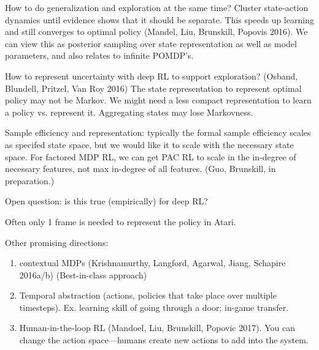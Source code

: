 How to do generalization and exploration at the same time?
Cluster state-action dynamics until evidence shows that it should be separate. This speeds up learning and still converges to optimal policy (Mandel, Liu, Brunskill, Popovis 2016). 
We can view this as posterior sampling over state representation as well as model parameters, and also relates to infinite POMDP's.

How to represent uncertainty with deep RL to support exploration? (Osband, Blundell, Pritzel, Van Roy 2016)  
The state representation to represent optimal policy may not be Markov. We might need a less compact representation to learn a policy vs. represent it. Aggregating states may lose Markovness.

Sample efficiency and representation: typically the formal sample efficiency scales as specifed state space, but we would like it to scale with the necessary state space. For factored MDP RL, we can get PAC RL to scale in the in-degree of necessary features, not max in-degree of all features.  (Guo, Brunskill, in preparation.)

Open question: is this true (empirically) for deep RL?



Often only 1 frame is needed to represent the policy in Atari.

Other promising directions:
\begin{enumerate}
\item
contextual MDPs (Krishnamurthy, Langford, Agarwal, Jiang, Schapire 2016a/b) (Best-in-class approach)
\item
Temporal abstraction (actions, policies that take place over multiple timesteps). Ex. learning skill of going through a door; in-game transfer.
\item
Human-in-the-loop RL (Mandoel, Liu, Brunskill, Popovic 2017). You can change the action space---humans create new actions to add into the system.
\end{enumerate}


